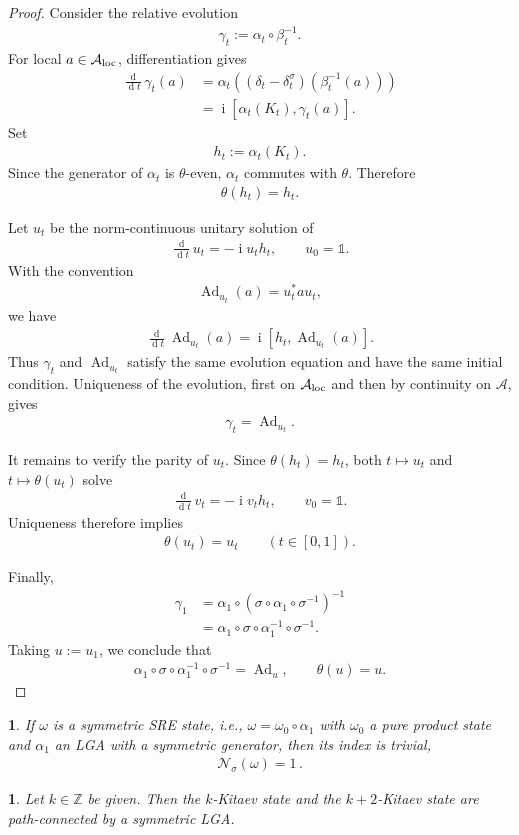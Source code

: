 \documentclass[a4paper,10pt]{article}
\numberwithin{equation}{section}
\theoremstyle{plain}
\theoremstyle{plain}
\theoremstyle{plain}
\newtheorem{cor}[cor]{\protect\corollaryname}
\theoremstyle{plain}
\theoremstyle{plain}
\newtheorem{claim}[claim]{\protect\claimname}
\theoremstyle{remark}
\theoremstyle{definition}
\providecommand{\claimname}{Claim}
\providecommand{\corollaryname}{Corollary}
\newcommand{\ii}{\operatorname{i}}
\newcommand{\ZZ}{\mathbb{Z}}
\newcommand{\calA}{\mathcal{A}}
\newcommand{\calN}{\mathcal{N}}
\newcommand{\dif}{\operatorname{d}\!} %
\newcommand{\Ad}[1]{\operatorname{Ad}_{#1}}
\newcommand{\Id}{\mathds{1}}
\newcommand{\eq}[1]{\begin{align*}#1\end{align*}}
\newcommand{\br}[1]{\left(#1\right)}
\begin{document}
\begin{proof}
Consider the relative evolution
\eq{
\gamma_t
:=
\alpha_t\circ\beta_t^{-1}.
}
For local $a\in\calA_{\rm loc}$, differentiation gives
\eq{
\frac{\dif}{\dif t}\gamma_t(a)
&=
\alpha_t\br{
\br{
\delta_t-\delta_t^\sigma
}
\br{
\beta_t^{-1}(a)
}
}\\
&=
\ii\left[
\alpha_t(K_t),
\gamma_t(a)
\right].
}
Set
\eq{
h_t
:=
\alpha_t(K_t).
}
Since the generator of $\alpha_t$ is $\theta$-even, $\alpha_t$ commutes
with $\theta$. Therefore
\eq{
\theta(h_t)
=
h_t.
}

Let $u_t$ be the norm-continuous unitary solution of
\eq{
\frac{\dif}{\dif t}u_t
=
-\ii u_t h_t,
\qquad
u_0
=
\Id.
}
With the convention
\eq{
\Ad{u_t}(a)
=
u_t^\ast a u_t,
}
we have
\eq{
\frac{\dif}{\dif t}
\Ad{u_t}(a)
=
\ii\left[
h_t,
\Ad{u_t}(a)
\right].
}
Thus $\gamma_t$ and $\Ad{u_t}$ satisfy the same evolution equation and
have the same initial condition. Uniqueness of the evolution, first on
$\calA_{\rm loc}$ and then by continuity on $\calA$, gives
\eq{
\gamma_t
=
\Ad{u_t}.
}

It remains to verify the parity of $u_t$. Since $\theta(h_t)=h_t$, both
$t\mapsto u_t$ and $t\mapsto\theta(u_t)$ solve
\eq{
\frac{\dif}{\dif t}v_t
=
-\ii v_t h_t,
\qquad
v_0
=
\Id.
}
Uniqueness therefore implies
\eq{
\theta(u_t)
=
u_t
\qquad
\br{
t\in[0,1]
}.
}

Finally,
\eq{
\gamma_1
&=
\alpha_1\circ
\br{
\sigma\circ\alpha_1\circ\sigma^{-1}
}^{-1}\\
&=
\alpha_1\circ\sigma\circ
\alpha_1^{-1}\circ\sigma^{-1}.
}
Taking $u:=u_1$, we conclude that
\eq{
\alpha_1\circ\sigma\circ
\alpha_1^{-1}\circ\sigma^{-1}
=
\Ad{u},
\qquad
\theta(u)
=
u.
}
\end{proof}

\begin{cor}
    If $\omega$ is a symmetric SRE state, i.e., $\omega=\omega_0\circ\alpha_1$ with $\omega_0$ a pure product state and $\alpha_1$ an LGA with a symmetric generator, then its index is trivial, \eq{
    \calN_\sigma(\omega) = 1\,.
    }
\end{cor}

\begin{claim}
    Let $k\in\ZZ$ be given. Then the $k$-Kitaev state and the $k+2$-Kitaev state are path-connected by a symmetric LGA.
\end{claim}
\end{document}

